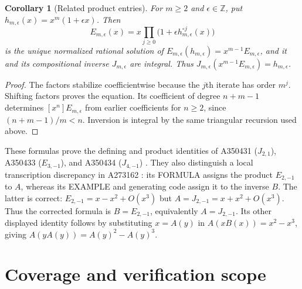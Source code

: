 \documentclass[11pt]{article}
\newtheorem{corollary}[theorem]{Corollary}
\newcommand{\Z}{\mathbb Z}
\begin{document}
\begin{samepage}
\begin{corollary}[Related product entries]\label{cor:products}
For $m\geq2$ and $\epsilon\in\Z$, put
$h_{m,\epsilon}(x)=x^m(1+\epsilon x)$. Then
\[
 E_{m,\epsilon}(x)=x\prod_{j\geq0}
       \bigl(1+\epsilon h_{m,\epsilon}^{\circ j}(x)\bigr)
\]
is the unique normalized rational solution of
$E_{m,\epsilon}(h_{m,\epsilon})=x^{m-1}E_{m,\epsilon}$, and it and
its compositional inverse $J_{m,\epsilon}$ are integral.
Thus $J_{m,\epsilon}(x^{m-1}E_{m,\epsilon})=h_{m,\epsilon}$.
\end{corollary}
\end{samepage}
\begin{proof}
The factors stabilize coefficientwise because the $j$th iterate has order
$m^j$. Shifting factors proves the equation. Its coefficient of degree
$n+m-1$ determines $[x^n]E_{m,\epsilon}$ from earlier coefficients
for $n\geq2$, since $(n+m-1)/m<n$. Inversion is integral by the same
triangular recursion used above.
\end{proof}

These formulas prove the defining and product identities of A350431
($J_{2,1}$), A350433 ($E_{3,-1}$), and A350434 ($J_{4,-1}$)
\cite{related}. They also distinguish a local transcription discrepancy
in A273162 \cite{related}: its FORMULA assigns the product $E_{2,-1}$
to $A$, whereas its EXAMPLE and generating code assign it to the inverse
$B$. The latter is correct: $E_{2,-1}=x-x^2+O(x^3)$ but
$A=J_{2,-1}=x+x^2+O(x^3)$. Thus the corrected formula is
$B=E_{2,-1}$, equivalently $A=J_{2,-1}$.
Its other displayed identity follows by substituting $x=A(y)$ in
$A(xB(x))=x^2-x^3$, giving $A(yA(y))=A(y)^2-A(y)^3$.

\section{Coverage and verification scope}
\end{document}
